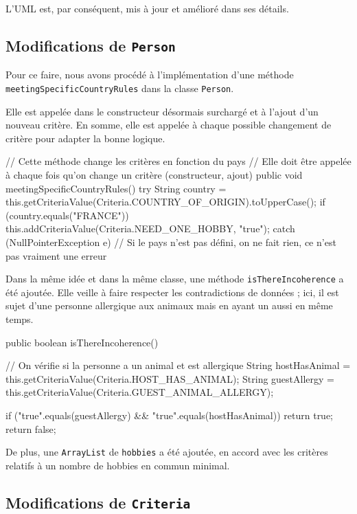 \documentclass{mytex}
\begin{document}
L'UML est, par conséquent, mis à jour et amélioré dans ses détails.


\subsection{Modifications de \texttt{Person}}

Pour ce faire, nous avons procédé à l'implémentation d'une méthode \texttt{meetingSpecificCountryRules} dans la classe \texttt{Person}.

Elle est appelée dans le constructeur désormais surchargé et à l'ajout d'un nouveau critère. En somme, elle est appelée à chaque possible changement de critère pour adapter la bonne logique.

\begin{codebox}
    // Cette méthode change les critères en fonction du pays
	// Elle doit être appelée à chaque fois qu'on change un critère (constructeur, ajout)
public void meetingSpecificCountryRules() {
	try {
		String country = this.getCriteriaValue(Criteria.COUNTRY_OF_ORIGIN).toUpperCase();
		if (country.equals("FRANCE")) {
			this.addCriteriaValue(Criteria.NEED_ONE_HOBBY, "true");
		}
	} catch (NullPointerException e) {
		// Si le pays n'est pas défini, on ne fait rien, ce n'est pas vraiment une erreur
	}
}
\end{codebox}

Dans la même idée et dans la même classe, une méthode \texttt{isThereIncoherence} a été ajoutée. Elle veille à faire respecter les contradictions de données ; ici, il est sujet d'une personne allergique aux animaux mais en ayant un aussi en même temps.

\begin{codebox}
public boolean isThereIncoherence() {
	// On vérifie si la personne a un animal et est allergique
	String hostHasAnimal = this.getCriteriaValue(Criteria.HOST_HAS_ANIMAL);
	String guestAllergy = this.getCriteriaValue(Criteria.GUEST_ANIMAL_ALLERGY);
	
	if ("true".equals(guestAllergy) && "true".equals(hostHasAnimal)) {
		return true;
	}
	return false;
}
\end{codebox}

De plus, une \texttt{ArrayList} de \texttt{hobbies} a été ajoutée, en accord avec les critères relatifs à un nombre de hobbies en commun minimal.

\subsection{Modifications de \texttt{Criteria}}
\end{document}
